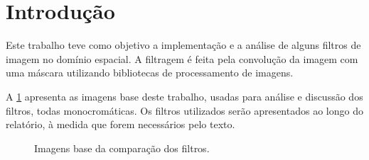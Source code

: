 \section{Introdução}

Este trabalho teve como objetivo a implementação e a análise de alguns filtros de imagem no domínio espacial. A filtragem é feita pela convolução da imagem com uma máscara utilizando bibliotecas de processamento de imagens.

A \cref{fig:base} apresenta as imagens base deste trabalho, usadas para análise e discussão dos filtros, todas monocromáticas. Os filtros utilizados serão apresentados ao longo do relatório, à medida que forem necessários pelo texto.

\begin{figure}[H]
    \centering
    

    \caption{Imagens base da comparação dos filtros.}
    \label{fig:base}
\end{figure}
